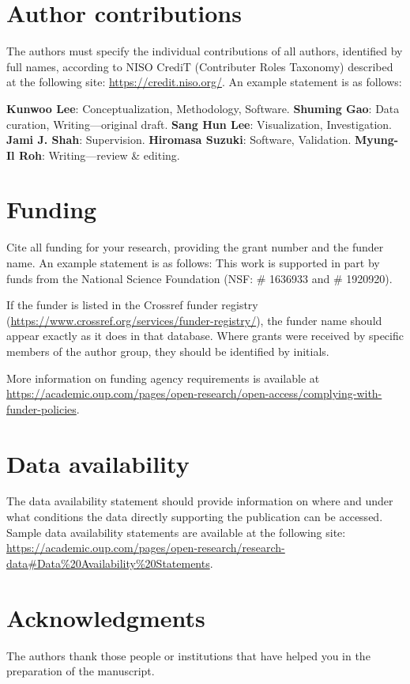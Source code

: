 \documentclass[12pt,a4paper]{article}
\begin{document}
\section*{Author contributions}
The authors must specify the individual contributions of all authors, identified by full names, according to NISO CrediT (Contributer Roles Taxonomy) described at the following site: \url{https://credit.niso.org/}. An example statement is as follows:

\noindent\textbf{Kunwoo Lee}: Conceptualization, Methodology, Software. \textbf{Shuming Gao}: Data curation, Writing—original draft. \textbf{Sang Hun Lee}: Visualization, Investigation. \textbf{Jami J. Shah}: Supervision. \textbf{Hiromasa Suzuki}: Software, Validation. \textbf{Myung-Il Roh}: Writing—review \& editing.

\section*{Funding}
Cite all funding for your research, providing the grant number and the funder name. An example statement is as follows: This work is supported in part by funds from the National Science Foundation (NSF: \# 1636933 and \# 1920920). 

If the funder is listed in the Crossref funder registry (\url{https://www.crossref.org/services/funder-registry/}), the funder name should appear exactly as it does in that database. Where grants were received by specific members of the author group, they should be identified by initials. 

More information on funding agency requirements is available at  \url{https://academic.oup.com/pages/open-research/open-access/complying-with-funder-policies}.

\section*{Data availability}
The data availability statement should provide information on where and under what conditions the data directly supporting the publication can be accessed. Sample data availability statements are available at the following site: \url{https://academic.oup.com/pages/open-research/research-data#Data%20Availability%20Statements}.

\section*{Acknowledgments}
The authors thank those people or institutions that have helped you in the preparation of the manuscript. 
\end{document}
